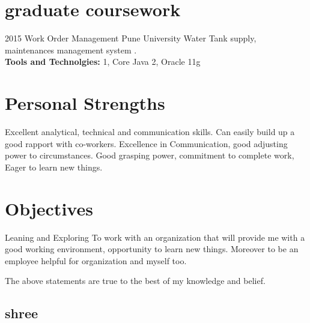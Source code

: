 \documentclass[]{cv-style}          %
\begin{document}
\section{graduate coursework}

\begin{entrylist}
\entry
{2015}
{Work Order Management} 
{Pune University}
{ Water Tank supply, maintenances management system . \\
  \textbf{Tools and Technolgies:} 1, Core Java 2, Oracle 11g}

\end{entrylist}

\section{Personal Strengths }

\begin{entrylist}
\entry
{}
{Excellent analytical, technical and communication skills.}
{ }
{Can easily build up a good rapport with co-workers. Excellence in Communication, good adjusting power to circumstances. Good grasping power, commitment to complete work, Eager to learn new things.}

\end{entrylist}

\section{Objectives}

\begin{entrylist}
\entry
{}
{ Leaning and Exploring  } 
{}
{ To work with an organization that will provide me with a good working environment, opportunity to learn new things. Moreover to be an employee helpful for organization and myself too.
} {}
\end{entrylist}

\begin{entrylist}
\entry
{}
{ The above statements are true to the best of my knowledge and belief.} 
{}

\end{entrylist}
\begin{flushright}  
\section{shree}
\end{flushright}
\end{document}
